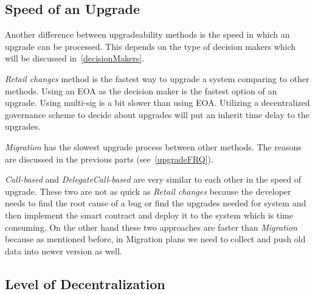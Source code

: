 

\subsection{Speed of an Upgrade}
 
 
Another difference between upgradeability methods is the speed in which an upgrade can be processed. This depends on the type of decision makers which will be discussed in~\ref{decisionMakers}. 

\textit{Retail changes} method is the fastest way to upgrade a system comparing to other methods. Using an EOA as the decision maker is the fastest option of an upgrade. Using multi-sig is a bit slower than using EOA. Utilizing a decentralized governance scheme to decide about upgrades will put an inherit time delay to the upgrades.

\textit{Migration} has the slowest upgrade process between other methods. The reasons are discussed in the previous parts (see~\ref{upgradeFRQ}).

\textit{Call-based} and \textit{DelegateCall-based} are very similar to each other in the speed of upgrade. These two are not as quick as \textit{Retail changes} because the developer needs to find the root cause of a bug or find the upgrades needed for system and then implement the smart contract and deploy it to the system which is time consuming.
On the other hand these two approaches are faster than \textit{Migration} because as mentioned before, in Migration plans we need to collect and push old data into newer version as well.  

 \subsection{Level of Decentralization}

